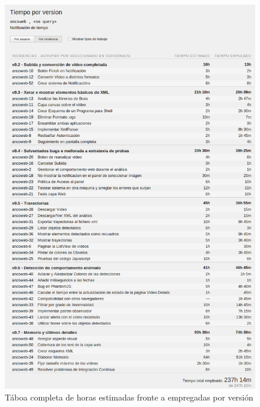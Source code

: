 \begin{figure}[htp]
\begin{center}
    \includegraphics[scale=0.5]{figures/YouTrack/taboaCompletaHoras.png}
    \caption{Táboa completa de horas estimadas fronte a empregadas por versión}
\label{fig:taboaCompletaHoras}
\end{center}
\end{figure}

